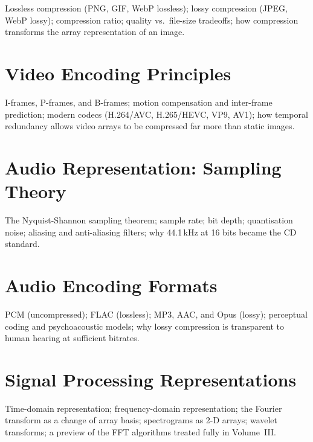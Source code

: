 Lossless compression (PNG, GIF, WebP lossless); lossy compression (JPEG,
WebP lossy); compression ratio; quality vs.\ file-size tradeoffs; how
compression transforms the array representation of an image.

\chapter{Video Encoding Principles}
\label{ch:video-encoding}

I-frames, P-frames, and B-frames; motion compensation and inter-frame
prediction; modern codecs (H.264/AVC, H.265/HEVC, VP9, AV1); how temporal
redundancy allows video arrays to be compressed far more than static images.

\chapter{Audio Representation: Sampling Theory}
\label{ch:audio-sampling}

The Nyquist-Shannon sampling theorem; sample rate; bit depth; quantisation
noise; aliasing and anti-aliasing filters; why 44.1\,kHz at 16 bits became
the CD standard.

\chapter{Audio Encoding Formats}
\label{ch:audio-encoding}

PCM (uncompressed); FLAC (lossless); MP3, AAC, and Opus (lossy); perceptual
coding and psychoacoustic models; why lossy compression is transparent to
human hearing at sufficient bitrates.

\chapter{Signal Processing Representations}
\label{ch:signal-processing-repr}

Time-domain representation; frequency-domain representation; the Fourier
transform as a change of array basis; spectrograms as 2-D arrays; wavelet
transforms; a preview of the FFT algorithms treated fully in Volume~III.


%
%

